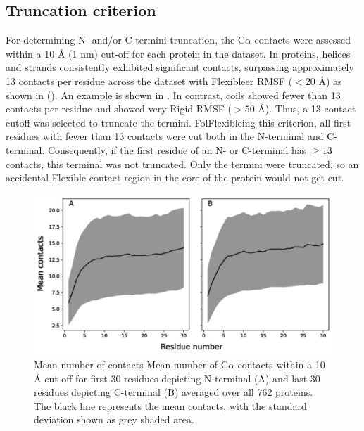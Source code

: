 \subsection*{Truncation criterion}\label{section:supNMA:truncation}

For determining N- and/or C-termini truncation, the C$\alpha$ contacts were assessed within a 10 Å (1 nm) cut-off for each protein in the dataset. In proteins, helices and strands consistently exhibited significant contacts, surpassing approximately 13 contacts per residue across the dataset with Flexibleer RMSF ($<20$ Å) as shown in (). An example is shown in . In contrast, coils showed fewer than 13 contacts per residue and showed very Rigid RMSF ($>50$ Å). Thus, a 13-contact cutoff was selected to truncate the termini.
FolFlexibleing this criterion, all first residues with fewer than 13 contacts were cut both in the N-terminal and C-terminal. Consequently, if the first residue of an N- or C-terminal has $\geq 13$ contacts, this terminal was not truncated. Only the termini were truncated, so an accidental Flexible contact region in the core of the protein would not get cut.


\begin{figure}[H]
    \centering
    \includegraphics[width=\linewidth]{pLDDT//plddt_figures//supplementary_bhawna/supfig14.pdf}
    \caption{Mean number of contacts Mean number of C$\alpha$ contacts within a 10 Å cut-off for first 30 residues depicting N-terminal (A) and last 30 residues depicting C-terminal (B) averaged over all 762 proteins. The black line represents the mean contacts, with the standard deviation shown as grey shaded area.}
    \label{fig:plddt_sup:sup14}
\end{figure}

